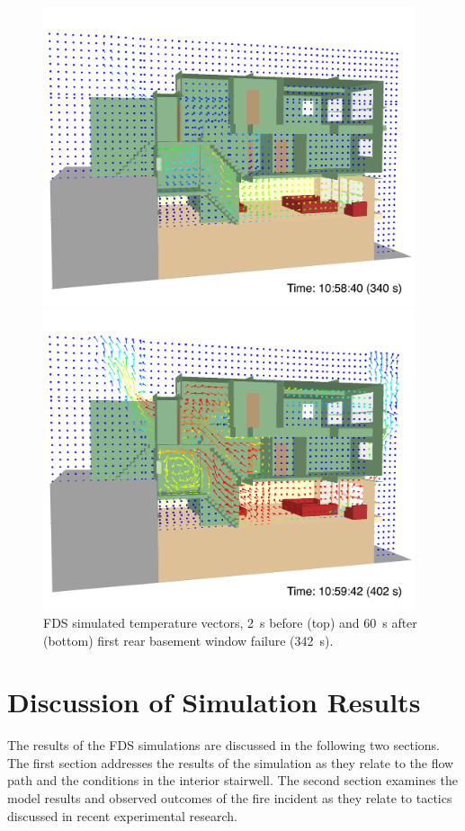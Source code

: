 \documentclass[12pt,oneside]{book}
\begin{document}
\begin{figure}[!ht]
\includegraphics[width=4.3in]{../Figures/SMV_Temp_Vec_340_s}


\includegraphics[width=4.3in]{../Figures/SMV_Temp_Vec_402_s}


\caption{FDS simulated temperature vectors, 2~s before (top) and 60~s after (bottom) first rear basement window failure (342~s).}
\label{fig:smv_temperature_vectors}
\end{figure}


\chapter{Discussion of Simulation Results}
\label{sec:discussion}

The results of the FDS simulations are discussed in the following two sections. The first section addresses the results of the simulation as they relate to the flow path and the conditions in the interior stairwell. The second section examines the model results and observed outcomes of the fire incident as they relate to tactics discussed in recent experimental research. 
\end{document}
